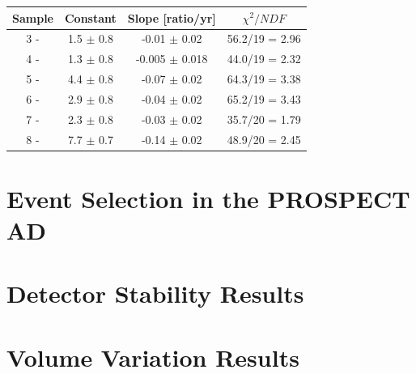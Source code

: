 \begin{table}[H]
	\centering
\begin{tabular}{|c|c|c|c|}
	\hline 
	Sample & Constant & Slope [ratio/yr] & $\chi^2/NDF$ \\ 
	\hline 
	3 -  & 1.5 $\pm$ 0.8 & -0.01 $\pm$ 0.02 & 56.2/19 = 2.96 \\ 
	\hline 
	4 -  & 1.3 $\pm$ 0.8 & -0.005 $\pm$ 0.018 & 44.0/19 = 2.32 \\ 
	\hline 
	5 -  & 4.4 $\pm$ 0.8 & -0.07 $\pm$ 0.02 & 64.3/19 = 3.38 \\ 
	\hline 
	6 -  & 2.9 $\pm$ 0.8 & -0.04 $\pm$ 0.02 & 65.2/19 = 3.43 \\ 
	\hline 
	7 -  & 2.3 $\pm$ 0.8 & -0.03 $\pm$ 0.02 & 35.7/20 = 1.79\\ 
	\hline 
	8 -  & 7.7 $\pm$ 0.7 & -0.14 $\pm$ 0.02 & 48.9/20 = 2.45 \\ 
	\hline 
\end{tabular} 
\end{table}


\section{Event Selection in the PROSPECT AD}

\section{Detector Stability Results}

\section{Volume Variation Results}

